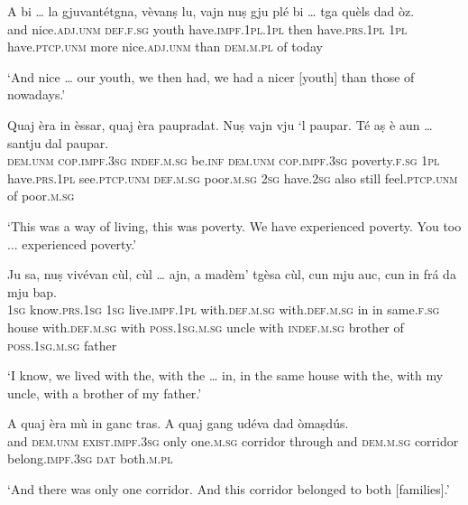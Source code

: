 \clearpage

\begin{linenumbers}
\gll    A bi … la gjuvantétgna, vèvanṣ lu, vajn nuṣ gju plé bi … tga quèls dad òz.\\
and nice.\textsc{adj.unm} {} \textsc{def.f.sg} youth have.\textsc{impf.1pl.1pl} then have.\textsc{prs.1pl} \textsc{1pl} have.\textsc{ptcp.unm} more nice.\textsc{adj.unm} {} than \textsc{dem.m.pl} of today\\
\end{linenumbers}
\medskip
\glt `And nice … our youth, we then had, we had a nicer [youth] than those of nowadays.'
\medskip

\begin{linenumbers}
\gll    Quaj èra in èssar, quaj èra paupradat. Nuṣ vajn vju `l paupar. Té aṣ è aun … santju dal paupar.\\
 \textsc{dem.unm} \textsc{cop.impf.3sg} \textsc{indef.m.sg} be.\textsc{inf}  \textsc{dem.unm} \textsc{cop.impf.3sg} poverty.\textsc{f.sg} \textsc{1pl} have.\textsc{prs.1pl} see.\textsc{ptcp.unm} \textsc{def.m.sg} poor.\textsc{m.sg} \textsc{2sg} have.\textsc{2sg} also still {} feel.\textsc{ptcp.unm} of poor.\textsc{m.sg}\\
\end{linenumbers}
\medskip
\glt `This was a way of living, this was poverty. We have experienced poverty. You too ... experienced poverty.'
\medskip

\begin{linenumbers}
\gll    Ju sa, nuṣ vivévan  cùl, cùl … ajn, a madèm' tgèsa cùl, cun mju auc, cun in frá da mju bap.\\
 \textsc{1sg} know.\textsc{prs.1sg} \textsc{1sg} live.\textsc{impf.1pl} with.\textsc{def.m.sg} with.\textsc{def.m.sg} {} in in same.\textsc{f.sg} house with.\textsc{def.m.sg} with \textsc{poss.1sg.m.sg} uncle with \textsc{indef.m.sg} brother of \textsc{poss.1sg.m.sg} father\\
\end{linenumbers}
\medskip
\glt `I know, we lived with the, with the … in, in the same house with the, with my uncle, with a brother of my father.'
\medskip

\begin{linenumbers}
\gll    A quaj èra mù in ganc tras. A quaj gang udéva dad òmaṣdús.\\
and \textsc{dem.unm} \textsc{exist.impf.3sg} only one.\textsc{m.sg} corridor through and \textsc{dem.m.sg} corridor belong.\textsc{impf.3sg} \textsc{dat} both.\textsc{m.pl}\\
\end{linenumbers}
\medskip
\glt `And there was only one corridor. And this corridor belonged to both [families].'
\medskip

